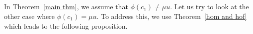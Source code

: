 \documentclass{amsart}
\newcommand{\thmref}[1]{Theorem~\ref{#1}}
\begin{document}
	
	
	\subsection{} In \thmref{main thm}, we assume that $\phi(c_1) \neq \mu u$. Let us try to look at the %
other case where $\phi(c_1) = \mu u$. To address this, we use  \thmref{hom and hof} which leads to the following proposition.
	
\end{document}
